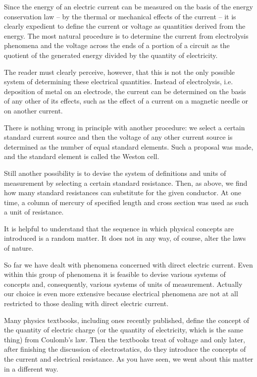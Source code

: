 Since the energy of an electric current can be measured on the basis of the energy conservation law -- by the thermal or mechanical effects of the current -- it is clearly expedient to define the current or voltage as quantities derived from the energy. The most natural procedure is to determine the current from electrolysis phenomena and the voltage across the ends of a portion of a circuit as the quotient of the generated energy divided by the quantity of electricity.

The reader must clearly perceive, however, that this is not the only possible system of determining these electrical quantities. Instead of electrolysis, i.e. deposition of metal on an electrode, the current can be determined on the basis of any other of its effects, such as the effect of a current on a magnetic needle or on another current.

There is nothing wrong in principle with another procedure: we select a certain standard current source and then the voltage of any other current source is determined as the number of equal standard elements. Such a proposal was made, and the standard element is called the Weston cell.

Still another possibility is to devise the system of definitions and units of measurement by selecting a certain standard resistance. Then, as above, we find how many standard resistances can substitute for the given conductor. At one time, a column of mercury of specified length and cross section was used as such a unit of resistance.

It is helpful to understand that the sequence in which physical concepts are introduced is a random matter. It does not in any way, of course, alter the laws of nature.

So far we have dealt with phenomena concerned with direct electric current. Even within this group of phenomena it is feasible to devise various systems of concepts and, consequently, various systems of units of measurement. Actually our choice is even more extensive because electrical phenomena are not at all restricted to those dealing with direct electric current.

Many physics textbooks, including ones recently published, define the concept of the quantity of electric charge (or the quantity of electricity, which is the same thing) from Coulomb's law. Then the textbooks treat of voltage and only later, after finishing the discussion of electrostatics, do they introduce the concepts of the current and electrical resistance. As you have seen, we went about this matter in a different way.

